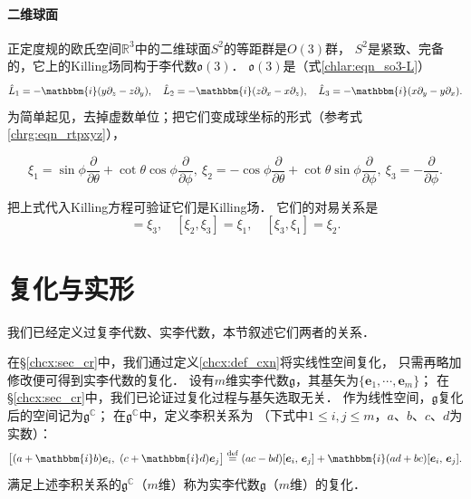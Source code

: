 \paragraph{二维球面}\label{chlg:sec_S2}
正定度规的欧氏空间$\mathbb{R}^3$中的二维球面$S^2$的等距群是$O(3)$群，
$S^2$是紧致、完备的，它上的Killing场同构于李代数$\mathfrak{o}(3)$．
$\mathfrak{o}(3)$是（式\eqref{chlar:eqn_so3-L}）
\begin{equation*}
        \hat{L}_1 = -\mathbbm{i} (y \partial_z - z \partial_y ), \quad
        \hat{L}_2 = -\mathbbm{i} (z \partial_x - x \partial_z ), \quad
        \hat{L}_3 = -\mathbbm{i} (x \partial_y - y \partial_x ).
\end{equation*}
为简单起见，去掉虚数单位；把它们变成球坐标的形式（参考式\eqref{chrg:eqn_rtpxyz}），
\begin{small}
\begin{equation}\label{chlg:eqn_S2-killing}
    \xi_1= \sin\phi \frac{\partial }{\partial \theta} + \cot\theta \cos\phi \frac{\partial }{\partial \phi},\
    \xi_2=-\cos\phi\frac{\partial }{\partial \theta}+\cot\theta\sin\phi \frac{\partial }{\partial \phi},\
    \xi_3=-\frac{\partial }{\partial \phi} .
\end{equation}
\end{small}
把上式代入Killing方程可验证它们是Killing场．
它们的对易关系是
\begin{equation}
    [\xi_1, \xi_2] = \xi_3, \quad
    [\xi_2, \xi_3] = \xi_1, \quad
    [\xi_3, \xi_1] = \xi_2 .
\end{equation}





\section{复化与实形}\label{chlg:sec_lrc}

我们已经定义过复李代数、实李代数，本节叙述它们两者的关系．

在\S\ref{chcx:sec_cr}中，我们通过定义\ref{chcx:def_cxn}将实线性空间复化，
只需再略加修改便可得到实李代数的复化．
设有$m$维实李代数$\mathfrak{g}$，其基矢为$\{\boldsymbol{e}_1,\cdots,\boldsymbol{e}_m\}$；
在\S\ref{chcx:sec_cr}中，我们已论证过复化过程与基矢选取无关．
作为线性空间，$\mathfrak{g}$复化后的空间记为$\mathfrak{g}^{\mathbb{C}}$；
在$\mathfrak{g}^{\mathbb{C}}$中，定义李积关系为
（下式中$1\leqslant i,j\leqslant m$，$a$、$b$、$c$、$d$为实数）：
\begin{equation}\label{chlg:eqn_rclc}
    \bigl[(a+\mathbbm{i}b) \boldsymbol{e}_i,\ (c+\mathbbm{i}d) \boldsymbol{e}_j \bigr] \overset{\mathrm {def}}{=}
    (ac-bd)[\boldsymbol{e}_i,\, \boldsymbol{e}_j] + \mathbbm{i}(ad+bc)[\boldsymbol{e}_i,\, \boldsymbol{e}_j].
\end{equation}
满足上述李积关系的$\mathfrak{g}^{\mathbb{C}}$（$m$维）称为实李代数$\mathfrak{g}$（$m$维）的{\heiti 复化}．


